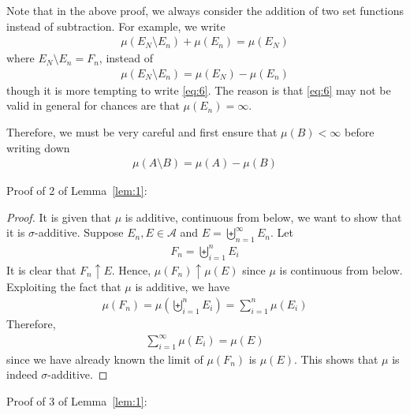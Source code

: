 \documentclass[thmcnt=section, 12pt, color=purple]{my-elegantbook}
\begin{document}
Note that in the above proof, we always
consider the addition of two set functions 
instead of subtraction.
For example,
we write 
\begin{align*}
	\mu(E_N \setminus E_n) + \mu(E_n) = \mu(E_N)
\end{align*}
where $E_N \setminus E_n = F_n$, instead of 
\begin{align}
	\mu(E_N \setminus E_n) = \mu(E_N) - \mu(E_n)
	\label{eq:6}
\end{align}
though it is more tempting to write \eqref{eq:6}.
The reason is that \eqref{eq:6} may not be valid in general 
for chances are that $\mu(E_n) = \infty$.

Therefore, we must be very careful
and first ensure that $\mu(B) < \infty$
before writing down
\begin{align*}
	\mu(A \setminus B) = \mu(A) - \mu(B)
\end{align*}

Proof of 2 of Lemma~\ref{lem:1}:

\begin{proof}
	It is given that $\mu$ is additive,
	continuous from below,
	we want to show that it is $\sigma$-additive.
	Suppose $E_n, E \in \mathcal{A}$ 
	and $E = \biguplus_{n=1}^\infty E_n$.
	Let
	\begin{align*}
		F_n = \biguplus_{i=1}^n E_i
	\end{align*}
	It is clear that $F_n \uparrow E$.
	Hence, $\mu(F_n) \uparrow \mu(E)$
	since $\mu$ is continuous from below.
	Exploiting the fact that $\mu$ is additive, we have
	\begin{align*}
		\mu(F_n) = \mu(\biguplus_{i=1}^n E_i)
		= \sum_{i=1}^n \mu(E_i)
	\end{align*}
	Therefore, 
	\begin{align*}
		\sum_{i=1}^\infty \mu(E_i) = \mu(E)
	\end{align*}
	since we have already known the limit of $\mu(F_n)$ is $\mu(E)$.
	This shows that $\mu$ is indeed $\sigma$-additive.
\end{proof}

Proof of 3 of Lemma~\ref{lem:1}:
\end{document}
